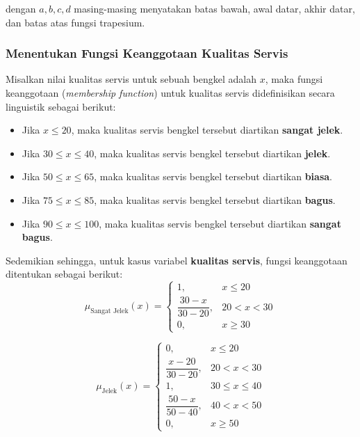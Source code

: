 \documentclass[12pt,a4paper]{article}
\theoremstyle{remark}
\begin{document}
dengan \(a, b, c, d\) masing-masing menyatakan batas bawah, awal datar, akhir datar, dan batas atas fungsi trapesium.


\subsubsection*{Menentukan Fungsi Keanggotaan Kualitas Servis}

Misalkan nilai kualitas servis untuk sebuah bengkel adalah $x$,
maka fungsi keanggotaan (\textit{membership function}) untuk kualitas servis didefinisikan secara linguistik sebagai berikut:

\begin{itemize}
    \item Jika $x \leq 20$, maka kualitas servis bengkel tersebut diartikan \textbf{sangat jelek}.
    \item Jika $30 \leq x \leq 40$, maka kualitas servis bengkel tersebut diartikan \textbf{jelek}.
    \item Jika $50 \leq x \leq 65$, maka kualitas servis bengkel tersebut diartikan \textbf{biasa}.
    \item Jika $75 \leq x \leq 85$, maka kualitas servis bengkel tersebut diartikan \textbf{bagus}.
    \item Jika $90 \leq x \leq 100$, maka kualitas servis bengkel tersebut diartikan \textbf{sangat bagus}.
\end{itemize}

Sedemikian sehingga, untuk kasus variabel \textbf{kualitas servis}, fungsi keanggotaan ditentukan sebagai berikut:
\[
    \mu_{\text{Sangat Jelek}}(x) =
    \begin{cases}
        1,                       & x \leq 20   \\
        \dfrac{30 - x}{30 - 20}, & 20 < x < 30 \\
        0,                       & x \geq 30
    \end{cases}
\]

\[
    \mu_{\text{Jelek}}(x) =
    \begin{cases}
        0,                       & x \leq 20         \\
        \dfrac{x - 20}{30 - 20}, & 20 < x < 30       \\
        1,                       & 30 \leq x \leq 40 \\
        \dfrac{50 - x}{50 - 40}, & 40 < x < 50       \\
        0,                       & x \geq 50
    \end{cases}
\]
\end{document}
